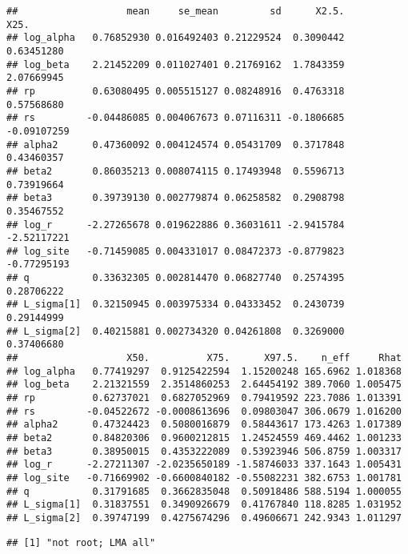\documentclass[12pt,]{article}
\begin{document}
\begin{verbatim}
##                   mean     se_mean         sd      X2.5.        X25.
## log_alpha   0.76852930 0.016492403 0.21229524  0.3090442  0.63451280
## log_beta    2.21452209 0.011027401 0.21769162  1.7843359  2.07669945
## rp          0.63080495 0.005515127 0.08248916  0.4763318  0.57568680
## rs         -0.04486085 0.004067673 0.07116311 -0.1806685 -0.09107259
## alpha2      0.47360092 0.004124574 0.05431709  0.3717848  0.43460357
## beta2       0.86035213 0.008074115 0.17493948  0.5596713  0.73919664
## beta3       0.39739130 0.002779874 0.06258582  0.2908798  0.35467552
## log_r      -2.27265678 0.019622886 0.36031611 -2.9415784 -2.52117221
## log_site   -0.71459085 0.004331017 0.08472373 -0.8779823 -0.77295193
## q           0.33632305 0.002814470 0.06827740  0.2574395  0.28706222
## L_sigma[1]  0.32150945 0.003975334 0.04333452  0.2430739  0.29144999
## L_sigma[2]  0.40215881 0.002734320 0.04261808  0.3269000  0.37406680
##                   X50.          X75.      X97.5.    n_eff     Rhat
## log_alpha   0.77419297  0.9125422594  1.15200248 165.6962 1.018368
## log_beta    2.21321559  2.3514860253  2.64454192 389.7060 1.005475
## rp          0.62737021  0.6827052969  0.79419592 223.7086 1.013391
## rs         -0.04522672 -0.0008613696  0.09803047 306.0679 1.016200
## alpha2      0.47324423  0.5080016879  0.58443617 173.4263 1.017389
## beta2       0.84820306  0.9600212815  1.24524559 469.4462 1.001233
## beta3       0.38950015  0.4353222089  0.53923946 506.8759 1.003317
## log_r      -2.27211307 -2.0235650189 -1.58746033 337.1643 1.005431
## log_site   -0.71669902 -0.6600840182 -0.55082231 382.6753 1.001781
## q           0.31791685  0.3662835048  0.50918486 588.5194 1.000055
## L_sigma[1]  0.31837551  0.3490926679  0.41767840 118.8285 1.031952
## L_sigma[2]  0.39747199  0.4275674296  0.49606671 242.9343 1.011297
\end{verbatim}

\begin{verbatim}
## [1] "not root; LMA all"
\end{verbatim}
\end{document}
